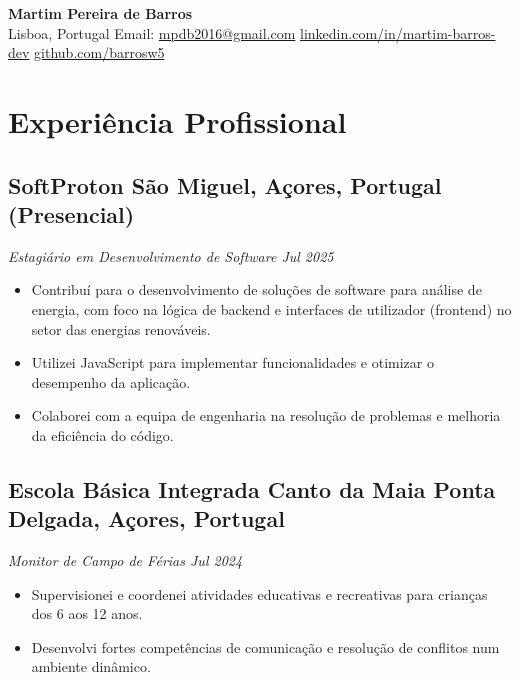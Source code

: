 \documentclass[a4paper,10pt]{article}
\begin{document}
\begin{center}
    {\LARGE \textbf{Martim Pereira de Barros}} 
    \\ [0.1cm]
    Lisboa, Portugal
    {\textbullet}
    Email: \href{mailto:mpdb2016@gmail.com}{mpdb2016@gmail.com} 
    {\textbullet}
    \href{https://www.linkedin.com/in/martim-barros-dev/}{linkedin.com/in/martim-barros-dev} 
    {\textbullet}
    \href{https://github.com/barrosw5}{github.com/barrosw5}
\end{center}


\section{Experiência Profissional}
    \subsection*{\texorpdfstring{
            \textbf{SoftProton} \hfill São Miguel, Açores, Portugal (Presencial)
        }{
            SoftProton -- São Miguel, Açores, Portugal
        }}
    \textit{Estagiário em Desenvolvimento de Software \hfill Jul 2025}
        \begin{itemize} 
            \item Contribuí para o desenvolvimento de soluções de software para análise de energia, com foco na lógica de backend e interfaces de utilizador (frontend) no setor das energias renováveis.
            \item Utilizei JavaScript para implementar funcionalidades e otimizar o desempenho da aplicação.
            \item Colaborei com a equipa de engenharia na resolução de problemas e melhoria da eficiência do código.
        \end{itemize}

    \subsection*{\texorpdfstring{
            \textbf{Escola Básica Integrada Canto da Maia} \hfill Ponta Delgada, Açores, Portugal
        }{
            Escola Básica Integrada Canto da Maia -- Ponta Delgada, Açores, Portugal
        }}
    \textit{Monitor de Campo de Férias \hfill Jul 2024}
        \begin{itemize}
            \item Supervisionei e coordenei atividades educativas e recreativas para crianças dos 6 aos 12 anos.
            \item Desenvolvi fortes competências de comunicação e resolução de conflitos num ambiente dinâmico.
        \end{itemize}
        
\end{document}
